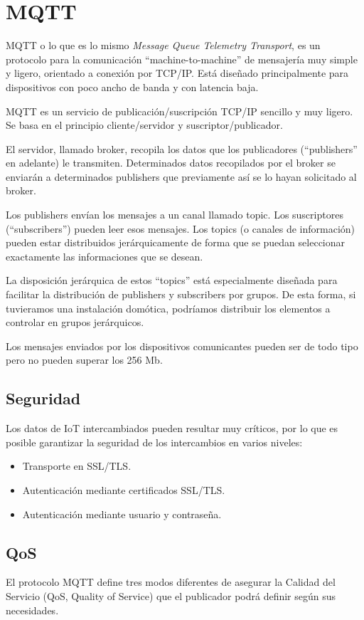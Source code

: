 \section{MQTT}
\label{makereference4.2}
MQTT o lo que es lo mismo \textit{Message Queue Telemetry Transport}, es un protocolo para la comunicación ``machine-to-machine'' de mensajería muy simple y ligero, orientado a conexión por TCP/IP. Está diseñado principalmente para dispositivos con poco ancho de banda y con latencia baja.

MQTT es un servicio de publicación/suscripción TCP/IP sencillo y muy ligero. Se basa en el principio cliente/servidor y suscriptor/publicador.

El servidor, llamado broker, recopila los datos que los publicadores (``publishers'' en adelante) le transmiten. Determinados datos recopilados por el broker se enviarán a determinados publishers que previamente así se lo hayan solicitado al broker.

Los publishers envían los mensajes a un canal llamado topic. Los suscriptores (``subscribers'') pueden leer esos mensajes. Los topics (o canales de información) pueden estar distribuidos jerárquicamente de forma que se puedan seleccionar exactamente las informaciones que se desean.

La disposición jerárquica de estos ``topics'' está especialmente diseñada para facilitar la distribución de publishers y subscribers por grupos. De esta forma, si tuvieramos una instalación domótica, podríamos distribuir los elementos a controlar en grupos jerárquicos.

Los mensajes enviados por los dispositivos comunicantes pueden ser de todo tipo pero no pueden superar los 256 Mb.

\subsection{Seguridad}
Los datos de IoT intercambiados pueden resultar muy críticos, por lo que es posible garantizar la seguridad de los intercambios en varios niveles:

\begin{itemize}
\item Transporte en SSL/TLS.
\item Autenticación mediante certificados SSL/TLS.
\item Autenticación mediante usuario y contraseña.
\end{itemize}

\subsection{QoS}
El protocolo MQTT define tres modos diferentes de asegurar la Calidad del Servicio (QoS, Quality of Service) que el publicador podrá definir según sus necesidades.

